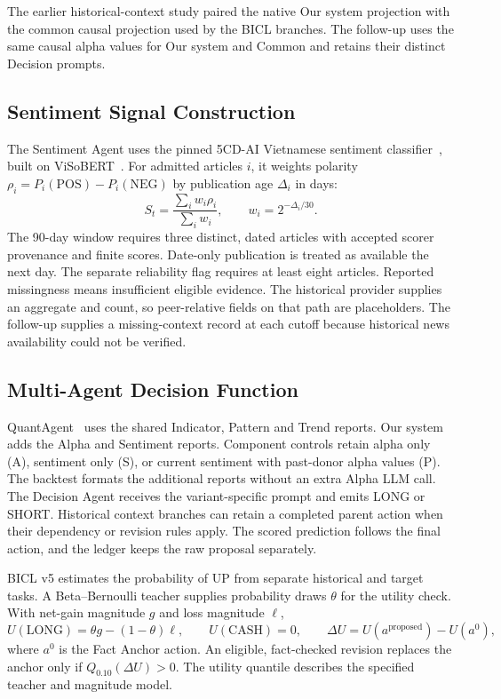 The earlier historical-context study paired the native Our system
projection with the common causal projection used by the BICL branches.
The follow-up uses the same causal alpha values for Our system and Common
and retains their distinct Decision prompts.

\subsection{Sentiment Signal Construction}
The Sentiment Agent uses the pinned
5CD-AI Vietnamese sentiment classifier~\cite{hf5cdsentiment}, built on
ViSoBERT~\cite{nguyen2023visobert}. For admitted articles \(i\), it
weights polarity \(\rho_i=P_i(\mathrm{POS})-P_i(\mathrm{NEG})\) by
publication age \(\Delta_i\) in days:
\begin{equation}
  S_t=\frac{\sum_i w_i\rho_i}{\sum_i w_i},
  \qquad w_i=2^{-\Delta_i/30}.
\end{equation}
The 90-day window requires three distinct, dated articles with accepted
scorer provenance and finite scores. Date-only publication is treated as
available the next day. The separate reliability flag requires at least
eight articles. Reported missingness means insufficient eligible evidence.
The historical provider supplies an aggregate and count, so peer-relative
fields on that path are placeholders. The follow-up supplies a missing-context record at each cutoff because
historical news availability could not be verified.

\subsection{Multi-Agent Decision Function}
QuantAgent~\cite{xiong2025quantagent} uses the shared Indicator, Pattern
and Trend reports. Our system adds the Alpha and Sentiment reports.
Component controls retain alpha only (A), sentiment only (S), or current
sentiment with past-donor alpha values (P). The backtest formats the
additional reports without an extra Alpha LLM call. The Decision Agent
receives the variant-specific prompt and emits LONG or SHORT. Historical
context branches can retain a completed parent action when their dependency
or revision rules apply. The scored prediction follows the final action,
and the ledger keeps the raw proposal separately.

BICL v5 estimates the probability of UP from separate historical and
target tasks. A Beta--Bernoulli teacher supplies probability draws
\(\theta\) for the utility check. With net-gain magnitude \(g\) and
loss magnitude \(\ell\),
\begin{equation}
  U(\mathrm{LONG})=\theta g-(1-\theta)\ell,\qquad
  U(\mathrm{CASH})=0,\qquad
  \Delta U=U(a^{\mathrm{proposed}})-U(a^0),
  \label{eq:revision_utility}
\end{equation}
where \(a^0\) is the Fact Anchor action. An eligible, fact-checked
revision replaces the anchor only if \(Q_{0.10}(\Delta U)>0\).
The utility quantile describes the specified teacher and magnitude model.

